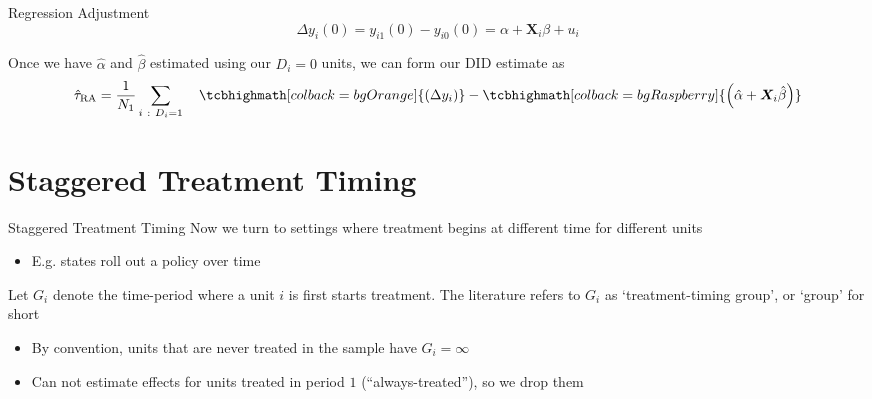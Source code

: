 \documentclass[aspectratio=169,t,11pt,table]{beamer}
\begin{document}
\begin{frame}{Regression Adjustment}
  \vspace*{-\bigskipamount}
  $$
    \Delta y_i(0) = y_{i1}(0) - y_{i0}(0) = \alpha + \bm{X}_i \beta + u_i
  $$
  
  \bigskip
  Once we have $\hat{\alpha}$ and $\hat{\beta}$ estimated using our $D_i = 0$ units, we can form our DID estimate as 
  $$
    \hat{\tau}_{\text{RA}} 
    = \frac{1}{N_1} \sum_{i \ : \ D_i = 1} \quad
    \tcbhighmath[colback = bgOrange]{\left( \Delta y_i \right) }
    - \tcbhighmath[colback = bgRaspberry]{\left( \hat{\alpha} + \bm{X}_i \hat{\beta} \right)}
  $$

\end{frame}




\section{Staggered Treatment Timing}

\begin{frame}{Staggered Treatment Timing}
  Now we turn to settings where treatment begins at different time for different units
  \begin{itemize}
    \item E.g. states roll out a policy over time
  \end{itemize}

  \bigskip
  Let $G_i$ denote the time-period where a unit $i$ is first starts treatment. The literature refers to $G_i$ as `treatment-timing group', or `group' for short
  \begin{itemize}
    \item By convention, units that are never treated in the sample have $G_i = \infty$
    
    \item Can not estimate effects for units treated in period $1$  (``always-treated''), so we drop them
  \end{itemize} 
\end{frame}
\end{document}
